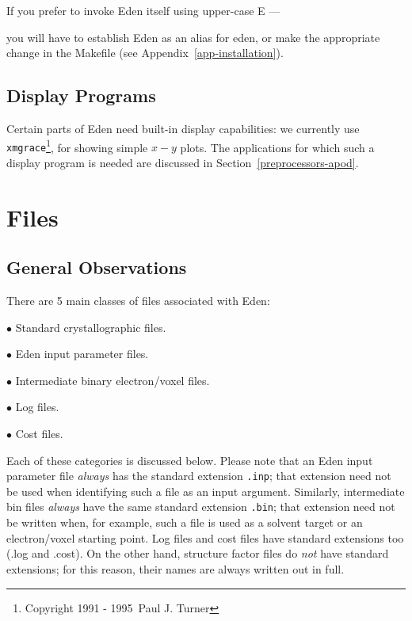 \documentclass{report}
\begin{document}

If you prefer to invoke Eden itself using upper-case E ---


you will have to establish Eden
as an alias for eden, or make the appropriate change in the 
Makefile (see Appendix~\ref{app-installation}).

\section{Display Programs}
\label{general-display}

Certain parts of Eden need built-in display capabilities: we currently use   
{\tt xmgrace}\footnote{Copyright 1991 - 1995~Paul J. Turner},
for showing simple $x-y$ plots.
The applications for which such a display program is needed are discussed 
in Section~\ref{preprocessors-apod}.

\chapter {Files}
\label{files}

\section {General Observations}
\label{files-general}

There are 5 main classes of files associated with Eden:

$\bullet$ Standard crystallographic files.  

$\bullet$ Eden input parameter files.

$\bullet$ Intermediate binary electron/voxel files.

$\bullet$ Log files.

$\bullet$ Cost files.

Each of these categories is discussed below.  Please note that an Eden input 
parameter file {\em always} has the standard extension {\tt .inp};
that extension need not be used when identifying such a file as an
input argument.  Similarly, intermediate bin files {\em always} have the 
same standard extension {\tt .bin};
that extension need not be written when, for example,
such a file is used as a solvent target or an electron/voxel
starting point. Log files and cost files have standard extensions too
(.log and .cost).   On the other hand, structure factor files  
do {\em not} have standard extensions; for this reason, their names
are always written out in full.
\end{document}
